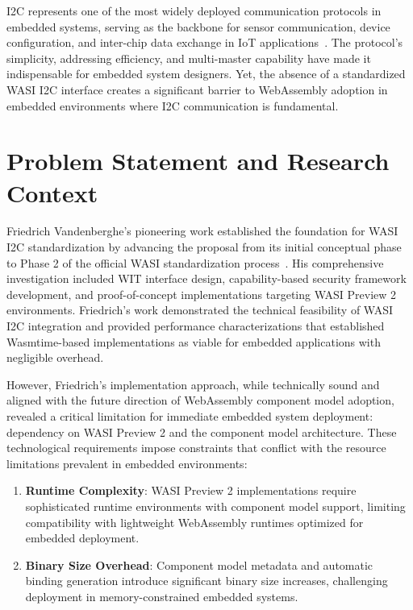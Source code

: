 I2C represents one of the most widely deployed communication protocols in embedded systems, serving as the backbone for sensor communication, device configuration, and inter-chip data exchange in IoT applications~\cite{i2c_specification}. The protocol's simplicity, addressing efficiency, and multi-master capability have made it indispensable for embedded system designers. Yet, the absence of a standardized WASI I2C interface creates a significant barrier to WebAssembly adoption in embedded environments where I2C communication is fundamental.

\section{Problem Statement and Research Context}
\label{sec:problem-statement}

Friedrich Vandenberghe's pioneering work established the foundation for WASI I2C standardization by advancing the proposal from its initial conceptual phase to Phase 2 of the official WASI standardization process~\cite{friedrich_thesis}. His comprehensive investigation included WIT interface design, capability-based security framework development, and proof-of-concept implementations targeting WASI Preview 2 environments. Friedrich's work demonstrated the technical feasibility of WASI I2C integration and provided performance characterizations that established Wasmtime-based implementations as viable for embedded applications with negligible overhead.

However, Friedrich's implementation approach, while technically sound and aligned with the future direction of WebAssembly component model adoption, revealed a critical limitation for immediate embedded system deployment: dependency on WASI Preview 2 and the component model architecture. These technological requirements impose constraints that conflict with the resource limitations prevalent in embedded environments:

\begin{enumerate}
    \item \textbf{Runtime Complexity}: WASI Preview 2 implementations require sophisticated runtime environments with component model support, limiting compatibility with lightweight WebAssembly runtimes optimized for embedded deployment.
    
    \item \textbf{Binary Size Overhead}: Component model metadata and automatic binding generation introduce significant binary size increases, challenging deployment in memory-constrained embedded systems.
\end{enumerate}

